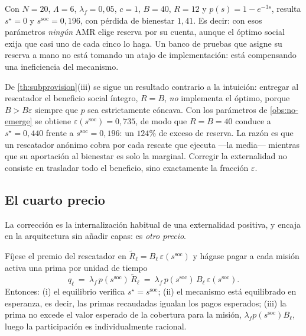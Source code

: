 \begin{observacion}
\label{obs:no-emerge}
Con $N=20$, $\Lambda=6$, $\lambda_f=0{,}05$, $c=1$, $B=40$, $R=12$ y
$p(s)=1-e^{-3s}$, resulta $s^\star=0$ y $s^{\mathrm{soc}}=0{,}196$, con pérdida
de bienestar $1{,}41$. Es decir: con esos parámetros \emph{ningún} AMR elige
reserva por su cuenta, aunque el óptimo social exija que casi uno de cada cinco
lo haga. Un banco de pruebas que asigne su reserva a mano no está tomando un
atajo de implementación: está compensando una ineficiencia del mecanismo.
\end{observacion}

\begin{observacion}
\label{obs:sobreprovision}
De \cref{th:subprovision}(iii) se sigue un resultado contrario a la intuición:
entregar al rescatador el beneficio social íntegro, $R=B$, \emph{no} implementa
el óptimo, porque $B>B\varepsilon$ siempre que $p$ sea estrictamente cóncava.
Con los parámetros de \cref{obs:no-emerge} se obtiene
$\varepsilon(s^{\mathrm{soc}})=0{,}735$, de modo que $R=B=40$ conduce a
$s^\star=0{,}440$ frente a $s^{\mathrm{soc}}=0{,}196$: un $124\%$ de exceso de
reserva. La razón es que un rescatador anónimo cobra por cada rescate que
ejecuta —la media— mientras que su aportación al bienestar es solo la marginal.
Corregir la externalidad no consiste en trasladar todo el beneficio, sino
exactamente la fracción $\varepsilon$.
\end{observacion}

\subsection{El cuarto precio}

La corrección es la internalización habitual de una externalidad positiva, y
encaja en la arquitectura sin añadir capas: es \emph{otro precio}.

\begin{teorema}
\label{th:prima}
Fíjese el premio del rescatador en
$\widetilde R_\ell=B_\ell\,\varepsilon(s^{\mathrm{soc}})$ y hágase pagar a cada
misión activa una prima por unidad de tiempo
\[
  q_\ell\ =\ \lambda_f\,p(s^{\mathrm{soc}})\,\widetilde R_\ell
  \ =\ \lambda_f\,p(s^{\mathrm{soc}})\,B_\ell\,\varepsilon(s^{\mathrm{soc}}).
\]
Entonces: (i) el equilibrio verifica $s^\star=s^{\mathrm{soc}}$; (ii) el
mecanismo está equilibrado en esperanza, es decir, las primas recaudadas igualan
los pagos esperados; (iii) la prima no excede el valor esperado de la cobertura
para la misión, $\lambda_f p(s^{\mathrm{soc}})B_\ell$, luego la participación es
individualmente racional.
\end{teorema}


